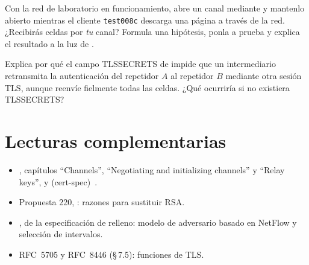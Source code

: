 \begin{esercizio}[3]\label{es:07-padding}
Con la red de laboratorio en funcionamiento, abre un canal mediante  y mantenlo abierto mientras el cliente \texttt{test008c} descarga una página a través de la red. ¿Recibirás celdas  por \emph{tu} canal? Formula una hipótesis, ponla a prueba y explica el resultado a la luz de .
\end{esercizio}

\begin{esercizio}[3]\label{es:07-mitm}
Explica por qué el campo TLSSECRETS de  impide que un intermediario retransmita la autenticación del repetidor $A$ al repetidor $B$ mediante otra sesión TLS, aunque reenvíe fielmente todas las celdas. ¿Qué ocurriría si no existiera TLSSECRETS?
\end{esercizio}

\section*{Lecturas complementarias}
\begin{itemize}
  \item {}, capítulos \enquote{Channels}, \enquote{Negotiating and initializing channels} y \enquote{Relay keys}, y  (cert-spec)~\cite{torspec}.
  \item Propuesta 220, : razones para sustituir RSA.
  \item {}, de la especificación de relleno: modelo de adversario basado en NetFlow y selección de intervalos.
  \item RFC~5705 y RFC~8446 (§\,7.5): funciones  de TLS.
\end{itemize}
